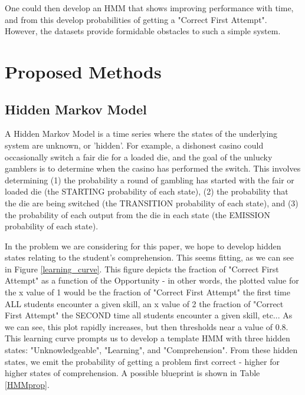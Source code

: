 \documentclass{article} %
\begin{document}
One could then develop an HMM that shows improving performance with time, and from this develop probabilities of getting a "Correct First Attempt". However, the datasets provide formidable obstacles to such a simple system.

\section{Proposed Methods}

\subsection{Hidden Markov Model}\label{HMM_sec}

A Hidden Markov Model is a time series where the states of the underlying system are unknown, or 'hidden'. For example, a dishonest casino could occasionally switch a fair die for a loaded die, and the goal of the unlucky gamblers is to determine when the casino has performed the switch. This involves determining (1) the probability a round of gambling has started with the fair or loaded die (the STARTING probability of each state), (2) the probability that the die are being switched (the TRANSITION probability of each state), and (3) the probability of each output from the die in each state (the EMISSION probability of each state).

In the problem we are considering for this paper, we hope to develop hidden states relating to the student's comprehension. This seems fitting, as we can see in Figure \ref{learning_curve}. This figure depicts the fraction of "Correct First Attempt" as a function of the Opportunity - in other words, the plotted value for the x value of 1 would be the fraction of "Correct First Attempt" the first time ALL students encounter a given skill, an x value of 2 the fraction of "Correct First Attempt" the SECOND time all students encounter a given skill, etc... As we can see, this plot rapidly increases, but then thresholds near a value of 0.8. This learning curve prompts us to develop a template HMM with three hidden states: "Unknowledgeable", "Learning", and "Comprehension". From these hidden states, we emit the probability of getting a problem first correct - higher for higher states of comprehension. A possible blueprint is shown in Table \ref{HMMprop}.
\end{document}
